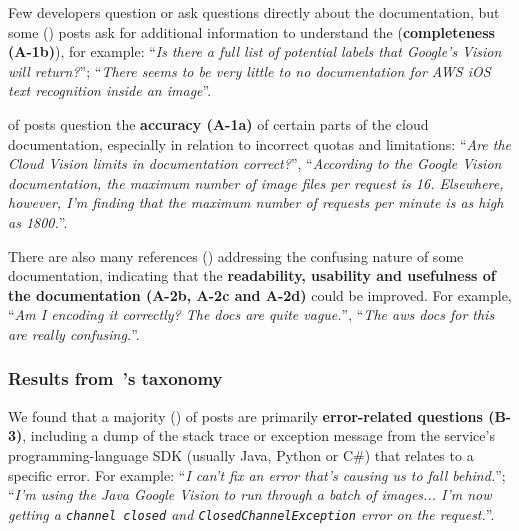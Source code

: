 %

Few developers question or ask questions directly about the  documentation, but some (\PctTaxACompleteness{}) posts ask for additional information to understand the  (\textbf{completeness (A-1b)}), for example: ``\textit{Is there a full list of potential labels that Google's Vision  will return?}''; ``\textit{There seems to be very little to no documentation for AWS iOS text recognition inside an image}''.

\PctTaxACorrectness{} of posts question the \textbf{accuracy (A-1a)} of certain parts of the cloud documentation, especially in relation to incorrect quotas and limitations: ``\textit{Are the Cloud Vision  limits in documentation correct?}'', ``\textit{According to the Google Vision documentation, the maximum number of image files per request is 16. Elsewhere, however, I'm finding that the maximum number of requests per minute is as high as 1800.}''.

There are also many references (\PctTaxADocumentation{}) addressing the confusing nature of some documentation, indicating that the \textbf{readability, usability and usefulness of the documentation (A-2b, A-2c and A-2d)} could be improved. For example, ``\textit{Am I encoding it correctly? The docs are quite vague.}'', ``\textit{The aws docs for this are really confusing.}''.

\subsubsection{Results from~\citeauthor{Beyer:2018fm}'s taxonomy}
\label{icse2020:sub:sub:resultsB}

%
We found that a majority (\PctTaxBErrors{}) of posts are primarily \textbf{error-related questions (B-3)}, including a dump of the stack trace or exception message from the service's programming-language SDK (usually Java, Python or C\#) that relates to a specific error. For example: ``\textit{I can't fix an error that's causing us to fall behind.}''; ``\textit{I'm using the Java Google Vision  to run through a batch of images... I'm now getting a \texttt{channel closed} and \texttt{ClosedChannelException} error on the request.}''.

